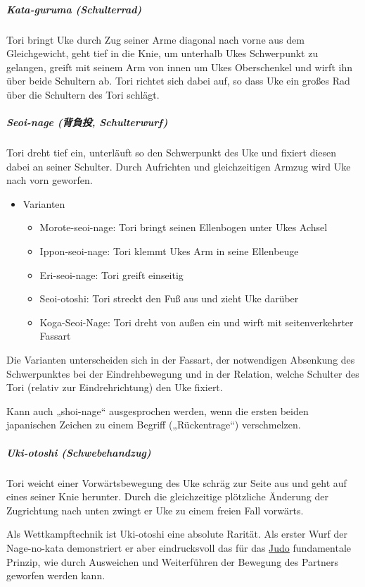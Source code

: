 \documentclass[justified, a4paper, notitlepage, captions=tableheading, nobib]{tufte-handout}
\begin{document}
\subparagraph{Kata-guruma (Schulterrad)}
\label{sec:org3f197fc}
Tori bringt Uke durch Zug seiner Arme diagonal nach vorne aus dem Gleichgewicht, geht tief in die Knie, um unterhalb Ukes Schwerpunkt zu gelangen, greift mit seinem Arm von innen um Ukes Oberschenkel und wirft ihn über beide Schultern ab. Tori richtet sich dabei auf, so dass Uke ein großes Rad über die Schultern des Tori schlägt.

\subparagraph{Seoi-nage (背負投, Schulterwurf)}
\label{sec:org56305f6}
Tori dreht tief ein, unterläuft so den Schwerpunkt des Uke und fixiert diesen dabei an seiner Schulter. Durch Aufrichten und gleichzeitigen Armzug wird Uke nach vorn geworfen.

\begin{itemize}
\item Varianten
\begin{itemize}
\item Morote-seoi-nage: Tori bringt seinen Ellenbogen unter Ukes Achsel
\item Ippon-seoi-nage: Tori klemmt Ukes Arm in seine Ellenbeuge
\item Eri-seoi-nage: Tori greift einseitig
\item Seoi-otoshi: Tori streckt den Fuß aus und zieht Uke darüber
\item Koga-Seoi-Nage: Tori dreht von außen ein und wirft mit seitenverkehrter Fassart
\end{itemize}
\end{itemize}

Die Varianten unterscheiden sich in der Fassart, der notwendigen Absenkung des Schwerpunktes bei der Eindrehbewegung und in der Relation, welche Schulter des Tori (relativ zur Eindrehrichtung) den Uke fixiert.

Kann auch „shoi-nage“ ausgesprochen werden, wenn die ersten beiden japanischen Zeichen zu einem Begriff („Rückentrage“) verschmelzen.

\subparagraph{Uki-otoshi (Schwebehandzug)}
\label{sec:org8bb08c8}
Tori weicht einer Vorwärtsbewegung des Uke schräg zur Seite aus und geht auf eines seiner Knie herunter. Durch die gleichzeitige plötzliche Änderung der Zugrichtung nach unten zwingt er Uke zu einem freien Fall vorwärts.

Als Wettkampftechnik ist Uki-otoshi eine absolute Rarität. Als erster Wurf der Nage-no-kata demonstriert er aber eindrucksvoll das für das \hyperref[org80c3996]{Judo} fundamentale Prinzip, wie durch Ausweichen und Weiterführen der Bewegung des Partners geworfen werden kann.
\end{document}
